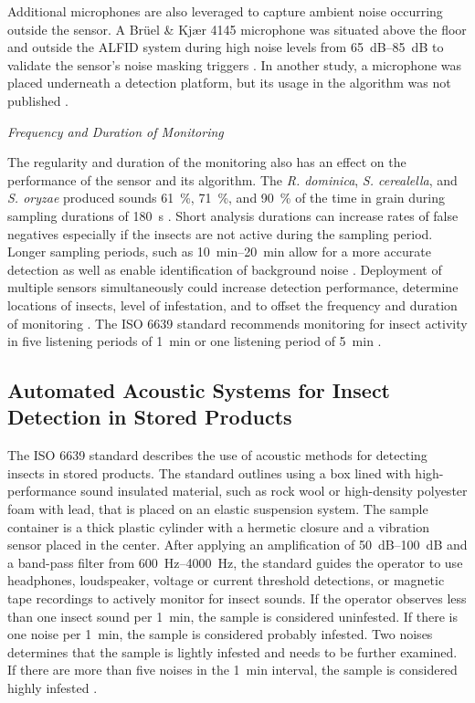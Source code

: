 \documentclass[../Vibro-Acoustic Signatures and Detection Algorithms for Stored Product Insects.tex]{subfiles}
\begin{document}
Additional microphones are also leveraged to capture ambient noise occurring outside the sensor. A Br\"{u}el \& Kj\ae r 4145 microphone was situated above the floor and outside the ALFID system during high noise levels from \SIrange{65}{85}{\deci\bel} to validate the sensor's noise masking triggers \cite{mankinShieldingNoiseInterfering1997}. In another study, a microphone was placed underneath a detection platform, but its usage in the algorithm was not published \cite{brandingNoiseRobustAcoustic2023}.

\newpage
\textit{Frequency and Duration of Monitoring}

The regularity and duration of the monitoring also has an effect on the performance of the sensor and its algorithm. The \textit{R. dominica}, \textit{S. cerealella}, and \textit{S. oryzae} produced sounds \SI{61}{\percent}, \SI{71}{\percent}, and \SI{90}{\percent} of the time in grain during sampling durations of \SI{180}{\second} \cite{vickSoundDetectionStoredProduct1988}. Short analysis durations can increase rates of false negatives especially if the insects are not active during the sampling period. Longer sampling periods, such as \SIrange{10}{20}{\minute} allow for a more accurate detection as well as enable identification of background noise \cite{mankinPerspectivePromiseCentury2011}. Deployment of multiple sensors simultaneously could increase detection performance, determine locations of insects, level of infestation, and to offset the frequency and duration of monitoring \cite{mankinPerspectivePromiseCentury2011}. The ISO 6639 standard recommends monitoring for insect activity in five listening periods of \SI{1}{\minute} or one listening period of \SI{5}{\minute} \cite{ISO6639Cereals1986}.

\subsection{Automated Acoustic Systems for Insect Detection in Stored Products}

The ISO 6639 standard describes the use of acoustic methods for detecting insects in stored products. The standard outlines using a box lined with high-performance sound insulated material, such as rock wool or high-density polyester foam with lead, that is placed on an elastic suspension system. The sample container is a thick plastic cylinder with a hermetic closure and a vibration sensor placed in the center. After applying an amplification of \SIrange{50}{100}{\deci\bel} and a band-pass filter from \SIrange{600}{4000}{\hertz}, the standard guides the operator to use headphones, loudspeaker, voltage or current threshold detections, or magnetic tape recordings to actively monitor for insect sounds. If the operator observes less than one insect sound per \SI{1}{\minute}, the sample is considered uninfested. If there is one noise per \SI{1}{\minute}, the sample is considered probably infested. Two noises determines that the sample is lightly infested and needs to be further examined. If there are more than five noises in the \SI{1}{\minute} interval, the sample is considered highly infested \cite{ISO6639Cereals1986}.
\end{document}
